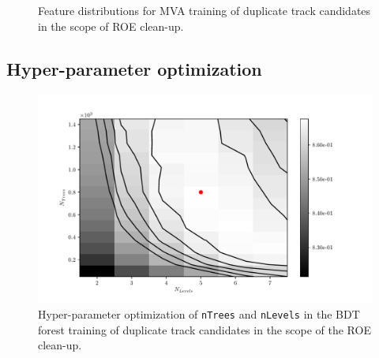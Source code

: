 \begin{figure}[H]
\caption{Feature distributions for MVA training of duplicate track candidates in the scope of ROE clean-up.}
\end{figure}


\subsection*{Hyper-parameter optimization}

\begin{figure}[H]
\centering
\captionsetup{width=0.8\linewidth}
\includegraphics[width=\linewidth]{fig/addendums/curl_hpo}
\caption{Hyper-parameter optimization of \texttt{nTrees} and \texttt{nLevels} in the BDT forest training of duplicate track candidates in the scope of the ROE clean-up.}
\end{figure}

